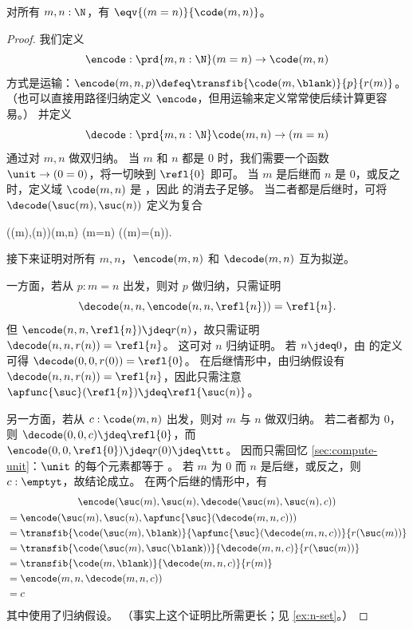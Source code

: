 \begin{thm}\label{thm:path-nat}
  对所有 $m,n:\N$，有 $\eqv{(m=n)}{\code(m,n)}$。
\end{thm}
\begin{proof}
  我们定义
  \[ \encode : \prd{m,n:\N} (m=n) \to \code(m,n) \]
  方式是运输：$\encode(m,n,p) \defeq \transfib{\code(m,{\blank})}{p}{r(m)}$。
  （也可以直接用路径归纳定义 $\encode$，但用运输来定义常常使后续计算更容易。）
  并定义
  \[ \decode : \prd{m,n:\N} \code(m,n) \to (m=n) \]
  通过对 $m,n$ 做双归纳。
  当 $m$ 和 $n$ 都是 $0$ 时，我们需要一个函数 $\unit \to (0=0)$，将一切映到 $\refl{0}$ 即可。
  当 $m$ 是后继而 $n$ 是 $0$，或反之时，定义域 $\code(m,n)$ 是 \emptyt，因此 \emptyt 的消去子足够。
  当二者都是后继时，可将 $\decode(\suc(m),\suc(n))$ 定义为复合
  \begin{narrowmultline*}
    \code(\suc(m),\suc(n))\jdeq\code(m,n)
     \narrowbreak
    (m=n)
    \xrightarrow{\apfunc{\suc}}
    (\suc(m)=\suc(n)).
  \end{narrowmultline*}
  接下来证明对所有 $m,n$，$\encode(m,n)$ 和 $\decode(m,n)$ 互为拟逆。

  一方面，若从 $p:m=n$ 出发，则对 $p$ 做归纳，只需证明
  \[\decode(n,n,\encode(n,n,\refl{n}))=\refl{n}.\]
  但 $\encode(n,n,\refl{n}) \jdeq r(n)$，故只需证明 $\decode(n,n,r(n)) =\refl{n}$。
  这可对 $n$ 归纳证明。
  若 $n\jdeq 0$，由 \decode 的定义可得 $\decode(0,0,r(0)) =\refl{0}$。
  在后继情形中，由归纳假设有 $\decode(n,n,r(n)) = \refl{n}$，因此只需注意 $\apfunc{\suc}(\refl{n}) \jdeq \refl{\suc(n)}$。

  另一方面，若从 $c:\code(m,n)$ 出发，则对 $m$ 与 $n$ 做双归纳。
  若二者都为 $0$，则 $\decode(0,0,c) \jdeq \refl{0}$，而 $\encode(0,0,\refl{0})\jdeq r(0) \jdeq \ttt$。
  因而只需回忆 \cref{sec:compute-unit}：$\unit$ 的每个元素都等于 \ttt。
  若 $m$ 为 $0$ 而 $n$ 是后继，或反之，则 $c:\emptyt$，故结论成立。
  在两个后继的情形中，有
  \begin{multline*}
    \encode(\suc(m),\suc(n),\decode(\suc(m),\suc(n),c))\\
    \begin{aligned}
    &= \encode(\suc(m),\suc(n),\apfunc{\suc}(\decode(m,n,c)))\\
    &= \transfib{\code(\suc(m),{\blank})}{\apfunc{\suc}(\decode(m,n,c))}{r(\suc(m))}\\
    &= \transfib{\code(\suc(m),\suc({\blank}))}{\decode(m,n,c)}{r(\suc(m))}\\
    &= \transfib{\code(m,{\blank})}{\decode(m,n,c)}{r(m)}\\
    &= \encode(m,n,\decode(m,n,c))\\
    &= c
  \end{aligned}
  \end{multline*}
  其中使用了归纳假设。
  （事实上这个证明比所需更长；见 \cref{ex:n-set}。）
\end{proof}

